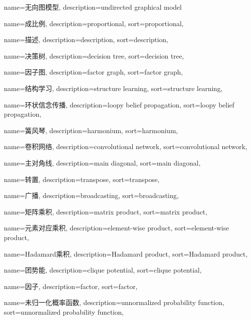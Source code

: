 {
  name=无向图模型,
  description={undirected graphical model}
}

{
  name=成比例,
  description={proportional},
  sort={proportional},
}

{
  name=描述,
  description={description},
  sort={description},
}

{
  name=决策树,
  description={decision tree},
  sort={decision tree},
}

{
  name=因子图,
  description={factor graph},
  sort={factor graph},
}

{
  name=结构学习,
  description={structure learning},
  sort={structure learning},
}

{
  name=环状信念传播,
  description={loopy belief propagation},
  sort={loopy belief propagation},
}

{
  name=簧风琴,
  description={harmonium},
  sort={harmonium},
}

{
  name=卷积网络,
  description={convolutional network},
  sort={convolutional network},
}

{
  name=主对角线,
  description={main diagonal},
  sort={main diagonal},
}

{
  name=转置,
  description={transpose},
  sort={transpose},
}

{
  name=广播,
  description={broadcasting},
  sort={broadcasting},
}

{
  name=矩阵乘积,
  description={matrix product},
  sort={matrix product},
}

{
  name=元素对应乘积,
  description={element-wise product},
  sort={element-wise product},
}

{
  name=Hadamard乘积,
  description={Hadamard product},
  sort={Hadamard product},
}

{
  name=团势能,
  description={clique potential},
  sort={clique potential},
}

{
  name=因子,
  description={factor},
  sort={factor},
}

{
  name=未归一化概率函数,
  description={unnormalized probability function},
  sort={unnormalized probability function},
}

